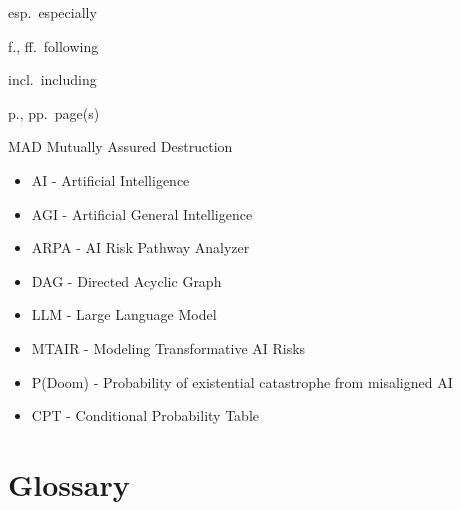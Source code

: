 \documentclass[
  letterpaper,
]{book}
\providecommand{\tightlist}{%
  \setlength{\itemsep}{0pt}\setlength{\parskip}{0pt}}
\begin{document}

esp.~especially

f., ff.~following

incl.~including

p., pp.~page(s)

MAD Mutually Assured Destruction

\begin{itemize}
\tightlist
\item
  AI - Artificial Intelligence\\
\item
  AGI - Artificial General Intelligence\\
\item
  ARPA - AI Risk Pathway Analyzer\\
\item
  DAG - Directed Acyclic Graph\\
\item
  LLM - Large Language Model\\
\item
  MTAIR - Modeling Transformative AI Risks\\
\item
  P(Doom) - Probability of existential catastrophe from misaligned AI\\
\item
  CPT - Conditional Probability Table
\end{itemize}

\section*{Glossary}\label{glossary}

\end{document}
